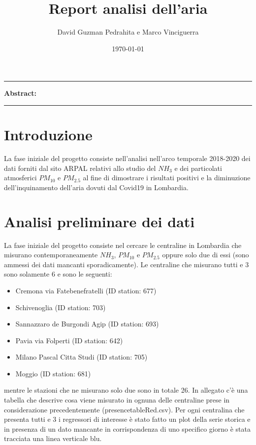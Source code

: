 \documentclass{article}
\title{Report analisi dell'aria}
\author{David Guzman Pedrahita e Marco Vinciguerra}
\date{\today}
\begin{document}
\maketitle

\par\noindent\rule{\textwidth}{0.4pt}
\textbf{Abstract:}
\par\noindent\rule{\textwidth}{0.4pt}

\section{Introduzione}
La fase iniziale del progetto consiste nell'analisi nell'arco temporale 2018-2020 dei dati 
forniti dal sito ARPAL relativi allo studio del $NH_{3}$ e dei particolati atmosferici $PM_{10}$ e $PM_{2.5}$ al 
fine di dimostrare i risultati positivi e la diminuzione dell'inquinamento dell'aria 
dovuti dal Covid19 in Lombardia.

\section{Analisi preliminare dei dati}
La fase iniziale del progetto consiste nel cercare le centraline in Lombardia
che misurano contemporaneamente $NH_{3}$, $PM_{10}$ e $PM_{2.5}$ oppure solo due di essi
(sono ammessi dei dati mancanti sporadicamente).
Le centraline che misurano tutti e 3 sono solamente 6 e sono le seguenti:
\begin{itemize}
    \item Cremona via Fatebenefratelli (ID station: 677)
    \item Schivenoglia (ID station: 703)
    \item Sannazzaro de Burgondi Agip (ID station: 693)
    \item Pavia via Folperti (ID station: 642)
    \item Milano Pascal Citta Studi (ID station: 705)
    \item Moggio (ID station: 681)
\end{itemize}
mentre le stazioni che ne misurano solo due sono in totale 26.
In allegato c'è una tabella che descrive cosa viene misurato in ognuna
delle centraline prese in considerazione precedentemente (presencetableRed.csv).
Per ogni centralina che presenta tutti e 3 i regressori di interesse è stato fatto
un plot della serie storica e in presenza di un dato mancante in corrispondenza
di uno specifico giorno è stata tracciata una linea verticale blu.
\end{document}
